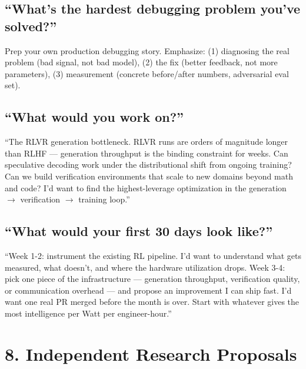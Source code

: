\subsection{``What's the hardest debugging problem you've solved?''}

Prep your own production debugging story. Emphasize: (1) diagnosing the real problem (bad signal, not bad model), (2) the fix (better feedback, not more parameters), (3) measurement (concrete before/after numbers, adversarial eval set).

\subsection{``What would you work on?''}

\begin{sayit}
``The RLVR generation bottleneck. RLVR runs are orders of magnitude longer than RLHF --- generation throughput is the binding constraint for weeks. Can speculative decoding work under the distributional shift from ongoing training? Can we build verification environments that scale to new domains beyond math and code? I'd want to find the highest-leverage optimization in the generation $\to$ verification $\to$ training loop.''
\end{sayit}

\subsection{``What would your first 30 days look like?''}

\begin{sayit}
``Week 1-2: instrument the existing RL pipeline. I'd want to understand what gets measured, what doesn't, and where the hardware utilization drops. Week 3-4: pick one piece of the infrastructure --- generation throughput, verification quality, or communication overhead --- and propose an improvement I can ship fast. I'd want one real PR merged before the month is over. Start with whatever gives the most intelligence per Watt per engineer-hour.''
\end{sayit}

\section{8. Independent Research Proposals}

